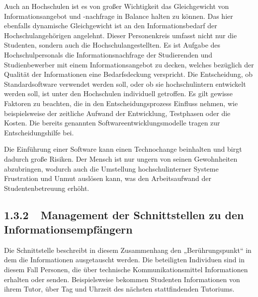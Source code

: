 \documentclass{article}
\begin{document}
\newline
Auch an Hochschulen ist es von großer Wichtigkeit das Gleichgewicht von Informationsangebot und -nachfrage in Balance
halten zu können. Das hier ebenfalls dynamische Gleichgewicht ist an den Informationsbedarf der Hochschulangehörigen
angelehnt. Dieser Personenkreis umfasst nicht nur die Studenten, sondern auch die Hochschulangestellten. Es ist Aufgabe
des Hochschulpersonals die Informationsnachfrage der Studierenden und Studienbewerber mit einem Informationsangebot zu
decken, welches bezüglich der Qualität der Informationen eine Bedarfsdeckung verspricht. Die Entscheidung, ob
Standardsoftware verwendet werden soll, oder ob sie hochschulintern entwickelt werden soll, ist unter den Hochschulen
individuell getroffen. Es gilt gewisse Faktoren zu beachten, die in den Entscheidungsprozess Einfluss nehmen, wie
beispielsweise der zeitliche Aufwand der Entwicklung, Testphasen oder die Kosten. Die bereits genannten
Softwareentwicklungsmodelle tragen zur Entscheidungshilfe bei.

Die Einführung einer Software kann einen Technochange beinhalten und birgt dadurch große Risiken. Der Mensch ist nur
ungern von seinen Gewohnheiten abzubringen, wodurch auch die Umstellung hochschulinterner Systeme Frustration und Unmut
auslösen kann, was den Arbeitsaufwand der Studentenbetreuung erhöht. 

\subsection[1.3.2\ \ Management der Schnittstellen zu den Informationsempfängern]{1.3.2\ \ Management der Schnittstellen
zu den Informationsempfängern}
Die Schnittstelle beschreibt in diesem Zusammenhang den „Berührungspunkt“ in dem die Informationen ausgetauscht werden.
Die beteiligten Individuen sind in diesem Fall Personen, die über technische Kommunikationsmittel Informationen
erhalten oder senden. Beispielsweise bekommen Studenten Informationen von ihrem Tutor, über Tag und Uhrzeit des
nächsten stattfindenden Tutoriums. 
\end{document}
